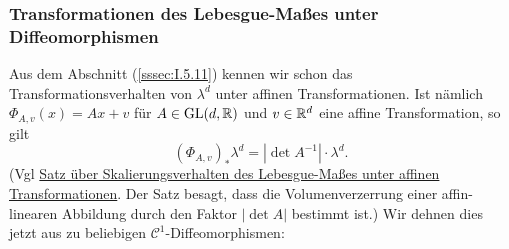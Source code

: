 \subsubsection{Transformationen des Lebesgue-Maßes unter Diffeomorphismen}
Aus dem Abschnitt (\ref{sssec:I.5.11}) kennen wir schon das Transformationsverhalten von $\lambda^d$ unter affinen Transformationen. Ist nämlich $\Phi_{A,v}(x)=Ax+v$ für $A\in\operatorname{GL}(d,\mathbb{R})$ und $v\in \mathbb{R}^d$ eine affine Transformation, so gilt
$$(\Phi_{A,v})_*\lambda^d = |\det A^{-1}|\cdot \lambda^d.$$
(Vgl \hyperref[skalierung-leb]{Satz über Skalierungsverhalten des Lebesgue-Maßes unter affinen Transformationen}. Der Satz besagt, dass die Volumenverzerrung einer affin-linearen Abbildung durch den Faktor $|\det A|$ bestimmt ist.) \vspace{0.3pc} \newline  Wir dehnen dies jetzt aus zu beliebigen $\mathcal{C}^1$-Diffeomorphismen:

